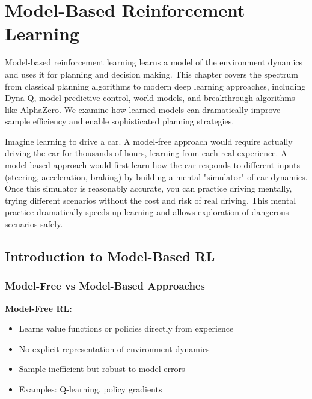\chapter{Model-Based Reinforcement Learning}
\label{ch:model-based-rl}

\begin{keyideabox}
Model-based reinforcement learning learns a model of the environment dynamics and uses it for planning and decision making. This chapter covers the spectrum from classical planning algorithms to modern deep learning approaches, including Dyna-Q, model-predictive control, world models, and breakthrough algorithms like AlphaZero. We examine how learned models can dramatically improve sample efficiency and enable sophisticated planning strategies.
\end{keyideabox}

\begin{intuitionbox}
Imagine learning to drive a car. A model-free approach would require actually driving the car for thousands of hours, learning from each real experience. A model-based approach would first learn how the car responds to different inputs (steering, acceleration, braking) by building a mental "simulator" of car dynamics. Once this simulator is reasonably accurate, you can practice driving mentally, trying different scenarios without the cost and risk of real driving. This mental practice dramatically speeds up learning and allows exploration of dangerous scenarios safely.
\end{intuitionbox}

\section{Introduction to Model-Based RL}

\subsection{Model-Free vs Model-Based Approaches}

\textbf{Model-Free RL:}
\begin{itemize}
    \item Learns value functions or policies directly from experience
    \item No explicit representation of environment dynamics
    \item Sample inefficient but robust to model errors
    \item Examples: Q-learning, policy gradients
\end{itemize}

